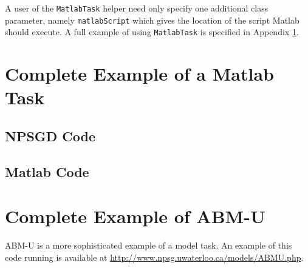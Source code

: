 \documentclass{article}
\newcommand{\mclass}[1]{\texttt{#1}}
\begin{document}
A user of the \mclass{MatlabTask} helper need only specify one additional class
parameter, namely \texttt{matlabScript} which gives the location of the script
Matlab should execute. A full example of using \mclass{MatlabTask} is specified
in Appendix \ref{sec:MatlabExample}.

\appendix

\section{Complete Example of a Matlab Task}
\label{sec:MatlabExample}
\subsection{NPSGD Code}


\subsection{Matlab Code}


\section{Complete Example of ABM-U}
ABM-U is a more sophisticated example of a model task. An example of this code
running is available at \url{http://www.npsg.uwaterloo.ca/models/ABMU.php}.

\end{document}
